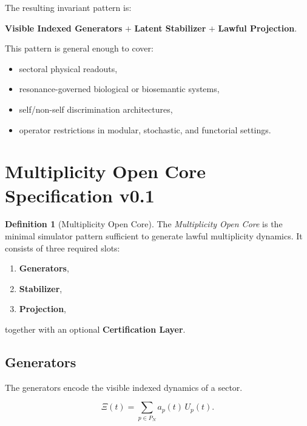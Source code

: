 \documentclass[11pt]{article}
\theoremstyle{plain}
\theoremstyle{definition}
\newtheorem{definition}[theorem]{Definition}
\theoremstyle{remark}
\begin{document}
The resulting invariant pattern is:

\begin{center}
\textbf{Visible Indexed Generators} \(+\) \textbf{Latent Stabilizer} \(+\) \textbf{Lawful Projection}.
\end{center}

This pattern is general enough to cover:
\begin{itemize}
    \item sectoral physical readouts,
    \item resonance-governed biological or biosemantic systems,
    \item self/non-self discrimination architectures,
    \item operator restrictions in modular, stochastic, and functorial settings.
\end{itemize}

\section{Multiplicity Open Core Specification v0.1}

\begin{definition}[Multiplicity Open Core]
The \emph{Multiplicity Open Core} is the minimal simulator pattern sufficient to generate lawful multiplicity dynamics. It consists of three required slots:
\begin{enumerate}
    \item \textbf{Generators},
    \item \textbf{Stabilizer},
    \item \textbf{Projection},
\end{enumerate}
together with an optional \textbf{Certification Layer}.
\end{definition}

\subsection{Generators}

The generators encode the visible indexed dynamics of a sector.

\begin{equation}
\Xi(t) = \sum_{p \in P_N} a_p(t)\, U_p(t).
\label{eq:generators}
\end{equation}
\end{document}
